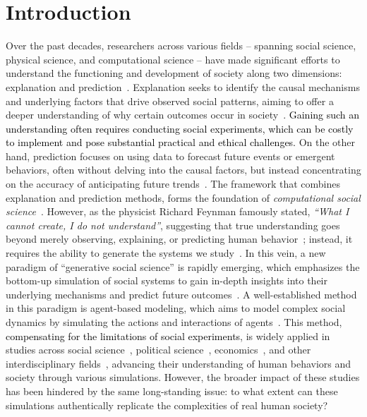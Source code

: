 \newcommand{\rvs}[1]{{\textcolor{black}{#1}}}
\section{Introduction}



Over the past decades, researchers across various fields -- spanning social science, physical science, and computational science -- have made significant efforts to understand the functioning and development of society along two dimensions: explanation and prediction~\cite{hofman2021integrating,lazer2009computational,lazer2020computational}. Explanation seeks to identify the causal mechanisms and underlying factors that drive observed social patterns, aiming to offer a deeper understanding of why certain outcomes occur in society~\cite{hofman2021integrating,hedstrom2010causal}. \rvs{Gaining such an understanding often requires conducting social experiments,  which can be costly to implement and pose substantial practical and ethical challenges.} On the other hand, prediction focuses on using data to forecast future events or emergent behaviors, often without delving into the causal factors, but instead concentrating on the accuracy of anticipating future trends~\cite{breiman2001statistical,hofman2021integrating}. The framework that combines explanation and prediction methods, forms the foundation of \textit{computational social science}~\cite{hofman2021integrating}. However, as the physicist Richard Feynman famously stated, \textit{``What I cannot create, I do not understand''}, suggesting that true understanding goes beyond merely observing, explaining, or predicting human behavior~\cite{epstein2012generative,epstein1999agent}; instead, it requires the ability to generate the systems we study~\cite{epstein2012generative,epstein1999agent}. In this vein, a new paradigm of ``generative social science'' is rapidly emerging, which emphasizes the bottom-up simulation of social systems to gain in-depth insights into their underlying mechanisms and predict future outcomes~\cite{epstein2012generative,epstein1999agent}. A well-established method in this paradigm is agent-based modeling, which aims to model complex social dynamics by simulating the actions and interactions of agents~\cite{epstein1999agent,macal2005tutorial,wilensky2015introduction}. This method, \rvs{compensating for the limitations of social experiments}, is widely applied in studies across social science~\cite{gilbert2000build,berry2002adaptive,gao2023s}, political science~\cite{de2014agent,laver2011party,li2024econagent}, economics~\cite{arthur2006out,feng2012linking}, and other interdisciplinary fields~\cite{an2021challenges,gao2024large,piao2023human,piao2025emergence}, advancing their understanding of human behaviors and society through various simulations. However, the broader impact of these studies has been hindered by the same long-standing issue: to what extent can these simulations authentically replicate the complexities of real human society?

